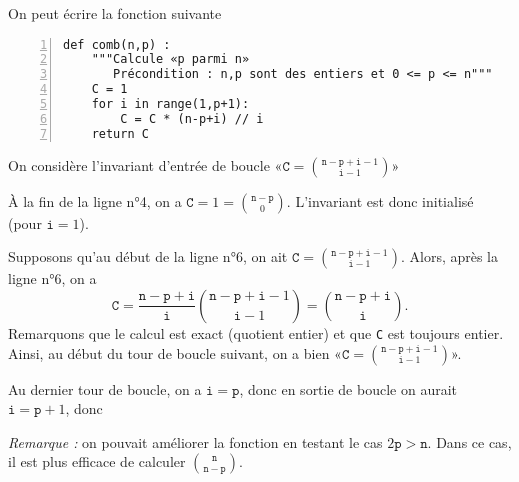 \exer{}
\setcounter{numques}{0}

\question{} On peut écrire la fonction suivante
\begin{Verbatim}[gobble=0,numbers=left]
def comb(n,p) :
    """Calcule «p parmi n»
       Précondition : n,p sont des entiers et 0 <= p <= n"""
    C = 1
    for i in range(1,p+1):
        C = C * (n-p+i) // i
    return C
\end{Verbatim}
\question{}
On considère l'invariant d'entrée de boucle «$\texttt{C} = \binom{\texttt n-\texttt p+\texttt i-1}{\texttt i-1}$»

À la fin de la  ligne n°4, on a $\texttt C = 1 = \binom{\texttt n-\texttt p}{0}$. L'invariant est donc initialisé (pour $\texttt i=1$).

Supposons qu'au début de la ligne n°6, on ait $\texttt{C} = \binom{\texttt n-\texttt p+\texttt i-1}{\texttt i-1}$. Alors, après la ligne n°6, on a 
\begin{equation*}
    \texttt C = \dfrac{\texttt n-\texttt p+\texttt i}{\texttt i}\binom{\texttt n-\texttt p+\texttt i-1}{\texttt i-1} = \binom{\texttt n-\texttt p+\texttt i}{\texttt i}.
\end{equation*}
Remarquons que le calcul est exact (quotient entier) et que \texttt C est toujours entier. 
Ainsi, au début du tour de boucle suivant, on a bien «$\texttt{C} = \binom{\texttt n-\texttt p+\texttt i-1}{\texttt i-1}$».

Au dernier tour de boucle, on a $\texttt i = \texttt p$, donc en sortie de boucle on aurait $\texttt i = \texttt p +1$, donc
\begin{center}
\end{center}

\emph{Remarque :} on pouvait améliorer la fonction en testant le cas $2\texttt p >\texttt n$. Dans ce cas, il est plus efficace de calculer $\binom{\texttt n}{\texttt n - \texttt p}$. 
